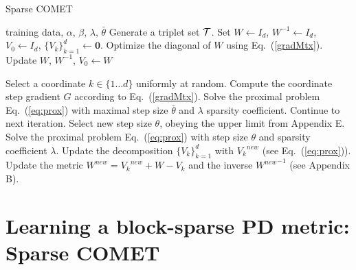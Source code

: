 \documentclass[twoside,11pt]{article}
\newcommand\mat[1]{{#1}}
\renewcommand\vec[1]{\mathbf{#1}}
\newcommand{\W}{\mat{W}}
\newcommand{\newW}{{\mat{W^{new}}}}
\newcommand{\ignore}[1]{}
\newcommand{\Vk}{\mat{V_k}}
\newcommand{\Vz}{\mat{V_0}}
\newcommand{\Vgrc}{\{\Vk\}_{k=1}^{d}} %
\newcommand{\cholL}{\mat{L}}
\renewcommand{\eqref}[1]{Eq.~(\ref{#1})}
\begin{document}
\begin{algorithm}[t]
   \caption{Sparse COMET}
   \label{alg:spcomet}
\begin{algorithmic}[1]
    training data, $\alpha$, $\beta$, $\lambda$, $\bar{\theta}$
    Generate a triplet set $\cal{T}$. Set $\W \leftarrow I_d$, $\W^{-1}  \leftarrow I_d$, $\Vz   \leftarrow I_d$, $\Vgrc \leftarrow \vec{0}$. 
   \STATE Optimize the diagonal of $\W$ using \eqref{gradMtx}. Update $\W$, $\W^{-1}$, $\Vz \leftarrow \W$
    
   \REPEAT 
   \STATE Select a coordinate $k \in \{1 \ldots d\}$ uniformly at random.
   \STATE Compute the coordinate step gradient $\mat{G}$ according to \eqref{gradMtx}.
   \STATE Solve the proximal problem \eqref{eq:prox} with maximal step size $\bar{\theta}$ and $\lambda$ sparsity coefficient.
   \IF {$\Vk^{new}$ == $\Vk$}
     \STATE Continue to next iteration.
   \ELSE 
      \STATE Select new step size $\theta$, obeying the upper limit from Appendix E.
       \STATE Solve the proximal problem \eqref{eq:prox} with step size $\theta$ and  sparsity coefficient $\lambda$.
      \STATE Update the decomposition $\Vgrc$ with $\Vk^{new}$ (see \eqref{eq:prox}).
      \STATE Update the metric $\newW = \Vk^{new} + \W - \Vk$ and the inverse $\newW^{-1}$ (see Appendix B).
    \ENDIF
\end{algorithmic}
\vskip -5pt
\end{algorithm}

\vspace{-6pt}
\section{Learning a block-sparse PD metric: Sparse COMET}\vskip -5pt
\ignore{The PD metric learned above can be used for extracting new features, but one is often interested to maintain interpretability with \emph{feature selection}: learn a metric which only relies on a small subset of the original feature set, or a small subset of feature pairs. To that end, we develop a method for learning feature-sparse PD metrics, using a block-coordinate descent method that maintains the PD property during training.}

\ignore{
The PD metric learned above does not take into account possible structures often found in feature interactions. }
\end{document}
